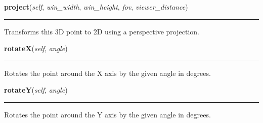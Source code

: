 \hspace{.8\funcindent}\begin{boxedminipage}{\funcwidth}

    \raggedright \textbf{project}(\textit{self}, \textit{win\_width}, \textit{win\_height}, \textit{fov}, \textit{viewer\_distance})

    \vspace{-1.5ex}

    \rule{\textwidth}{0.5\fboxrule}
\setlength{\parskip}{2ex}
    Transforms this 3D point to 2D using a perspective projection.

\setlength{\parskip}{1ex}
    \end{boxedminipage}

    \label{pygame-asteroids:polygon:Point3D:rotateX}

    \vspace{0.5ex}

\hspace{.8\funcindent}\begin{boxedminipage}{\funcwidth}

    \raggedright \textbf{rotateX}(\textit{self}, \textit{angle})

    \vspace{-1.5ex}

    \rule{\textwidth}{0.5\fboxrule}
\setlength{\parskip}{2ex}
    Rotates the point around the X axis by the given angle in degrees.

\setlength{\parskip}{1ex}
    \end{boxedminipage}

    \label{pygame-asteroids:polygon:Point3D:rotateY}

    \vspace{0.5ex}

\hspace{.8\funcindent}\begin{boxedminipage}{\funcwidth}

    \raggedright \textbf{rotateY}(\textit{self}, \textit{angle})

    \vspace{-1.5ex}

    \rule{\textwidth}{0.5\fboxrule}
\setlength{\parskip}{2ex}
    Rotates the point around the Y axis by the given angle in degrees.

\setlength{\parskip}{1ex}
    \end{boxedminipage}

